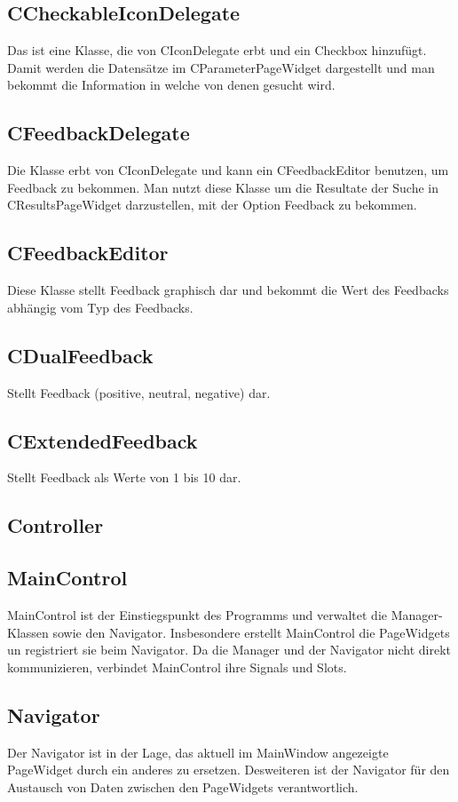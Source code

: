 \subsection*{CCheckableIconDelegate}
Das ist eine Klasse, die von CIconDelegate erbt und ein Checkbox hinzufügt. Damit werden die Datensätze im CParameterPageWidget dargestellt und man bekommt die Information in welche von denen gesucht wird. 

\subsection*{CFeedbackDelegate}
Die Klasse erbt von CIconDelegate und kann ein CFeedbackEditor benutzen, um Feedback zu bekommen. Man nutzt diese Klasse um die Resultate der Suche in CResultsPageWidget darzustellen, mit der Option Feedback zu bekommen. 

\subsection*{CFeedbackEditor}
Diese Klasse stellt Feedback graphisch dar und bekommt die Wert des Feedbacks abhängig vom Typ des Feedbacks.

\subsection*{CDualFeedback}

Stellt Feedback (positive, neutral, negative) dar.

\subsection*{CExtendedFeedback}
Stellt Feedback als Werte von 1 bis 10 dar.


\subsection{Controller}
\subsection*{MainControl}
MainControl ist der Einstiegspunkt des Programms und verwaltet die Manager-Klassen sowie den Navigator. Insbesondere erstellt MainControl die PageWidgets un registriert sie beim Navigator.
Da die Manager und der Navigator nicht direkt kommunizieren, verbindet MainControl ihre Signals und Slots.

\subsection*{Navigator}
Der Navigator ist in der Lage, das aktuell im MainWindow angezeigte PageWidget durch ein anderes zu ersetzen. Desweiteren ist der Navigator für den Austausch von Daten zwischen den PageWidgets verantwortlich.

